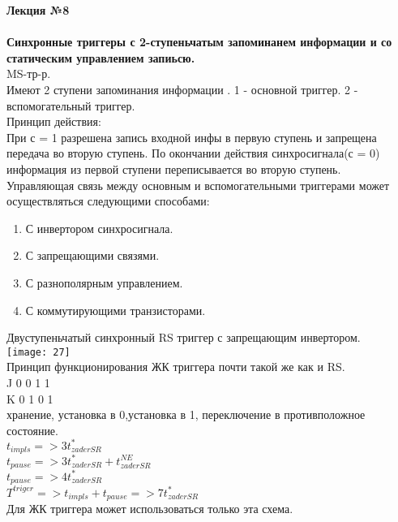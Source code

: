 \LARGE{ \textbf {Лекция №8}}\\
\Large{ \textbf {}}\\
\textbf{Синхронные триггеры с 2-ступеньчатым запоминанем информации и со статическим управлением запиьсю.}\\
MS-тр-р.\\
Имеют 2 ступени запоминания информации . 1 - основной триггер. 2 - вспомогательный триггер.\\
Принцип действия:\\
При с = 1 разрешена запись входной инфы в первую ступень и запрещена передача во вторую ступень.
По окончании действия синхросигнала(с = 0) информация из первой ступени переписывается во вторую ступень.\\
Управляющая связь между основным и вспомогательными триггерами может осуществляться следующими способами:

\begin{enumerate}
  \item С инвертором синхросигнала.
  \item С запрещающими связями.
  \item С разнополярным управлением.
  \item С коммутирующими транзисторами.
\end{enumerate}

\Large{Двуступеньчатый синхронный RS триггер с запрещающим инвертором. }\\
\texttt{[image: 27]} \\


Принцип функционирования ЖК триггера почти такой же как и RS.\\
J 0 0 1 1 \\
K 0 1 0 1 \\
хранение, установка в 0,установка в 1, переключение в противположное состояние. \\
$t_{impls} => 3t^*_{zaderSR}$\\
$t_{pause} => 3t^*_{zaderSR} + t^{NE}_{zaderSR} $\\
$t_{pause} => 4t^*_{zaderSR} $\\
$T^{triger}=>t_{impls} + t_{pause}  => 7 t^*_{zaderSR}$ \\

Для ЖК триггера может использоваться только эта схема.\\


